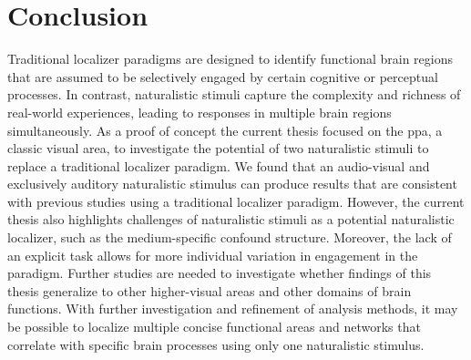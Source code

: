 \section{Conclusion}


%
Traditional localizer paradigms are designed to identify functional brain
regions that are assumed to be selectively engaged by certain cognitive or
perceptual processes.
%
In contrast, naturalistic stimuli capture the complexity and richness of
real-world experiences, leading to responses in multiple brain regions
simultaneously.
%
As a proof of concept the current thesis focused on the \ac{ppa}, a classic
visual area, to investigate the potential of two naturalistic stimuli to replace
a traditional localizer paradigm.
%
We found that an audio-visual and exclusively auditory naturalistic stimulus can
produce results that are consistent with previous studies using a traditional
localizer paradigm.
%
However, the current thesis also highlights challenges of naturalistic stimuli
as a potential naturalistic localizer, such as the medium-specific confound
structure.
%
Moreover, the lack of an explicit task allows for more individual variation in
engagement in the paradigm.
Further studies are needed to investigate whether findings of this thesis
generalize to other higher-visual areas and other domains of brain functions.
%
With further investigation and refinement of analysis methods, it may be
possible to localize multiple concise functional areas and networks that
correlate with specific brain processes using only one naturalistic stimulus.


